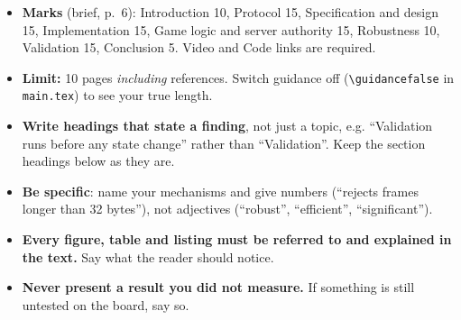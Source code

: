 \documentclass[conference]{IEEEtran}
\newif\ifguidance
\newenvironment{guidance}[1][Guidance]
  {\ifguidance\begin{guidebox}[#1]\else\setbox0\vbox\bgroup\fi}
  {\ifguidance\end{guidebox}\else\egroup\fi}
\renewcommand{\_}{\textunderscore\penalty0\hskip0pt\relax}
\begin{document}
\begin{guidance}[Before you start writing]
\begin{itemize}\setlength\itemsep{0pt}
\item \textbf{Marks} (brief, p.~6): Introduction 10, Protocol 15, Specification
  and design 15, Implementation 15, Game logic and server authority 15,
  Robustness 10, Validation 15, Conclusion 5. Video and Code links are required.
\item \textbf{Limit:} 10 pages \emph{including} references. Switch guidance off
  (\texttt{\textbackslash guidancefalse} in \texttt{main.tex}) to see your true length.
\item \textbf{Write headings that state a finding}, not just a topic, e.g.
  ``Validation runs before any state change'' rather than ``Validation''.
  Keep the section headings below as they are.
\item \textbf{Be specific}: name your mechanisms and give numbers
  (``rejects frames longer than 32 bytes''), not adjectives (``robust'',
  ``efficient'', ``significant'').
\item \textbf{Every figure, table and listing must be referred to and explained
  in the text.} Say what the reader should notice.
\item \textbf{Never present a result you did not measure.} If something is still
  untested on the board, say so.
\end{itemize}
\end{guidance}













\end{document}

